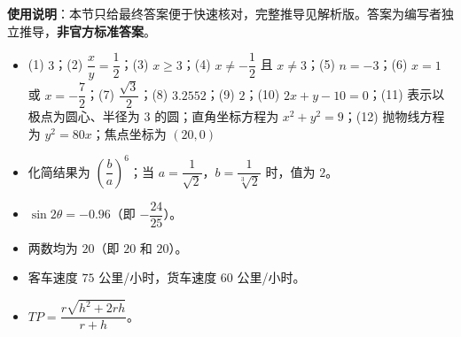 
\begin{gknotice}
\textbf{使用说明}：本节只给最终答案便于快速核对，完整推导见解析版。答案为编写者独立推导，\textbf{非官方标准答案}。
\end{gknotice}

\begin{itemize}[leftmargin=2.6em]
  \item[\textbf{1.}] (1) $3$；(2) $\dfrac{x}{y}=\dfrac12$；(3) $x\ge3$；(4) $x\ne-\dfrac12$ 且 $x\ne3$；(5) $n=-3$；(6) $x=1$ 或 $x=-\dfrac72$；(7) $\dfrac{\sqrt3}{2}$；(8) $3.2552$；(9) $2$；(10) $2x+y-10=0$；(11) 表示以极点为圆心、半径为 $3$ 的圆；直角坐标方程为 $x^2+y^2=9$；(12) 抛物线方程为 $y^2=80x$；焦点坐标为 $(20,0)$
  \item[\textbf{2.}] 化简结果为 $\left(\dfrac{b}{a}\right)^6$；当 $a=\dfrac{1}{\sqrt2}$，$b=\dfrac{1}{\sqrt[3]2}$ 时，值为 $2$。
  \item[\textbf{3.}] $\sin2\theta=-0.96$（即 $-\dfrac{24}{25}$）。
  \item[\textbf{4.}] 两数均为 $20$（即 $20$ 和 $20$）。
  \item[\textbf{5.}] 客车速度 $75$ 公里/小时，货车速度 $60$ 公里/小时。
  \item[\textbf{6.}] $TP=\dfrac{r\sqrt{h^2+2rh}}{r+h}$。
\end{itemize}
